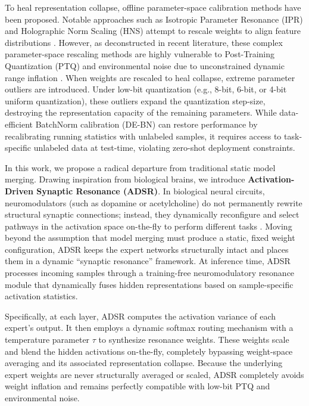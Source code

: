 \documentclass{article}
\theoremstyle{plain}
\theoremstyle{definition}
\theoremstyle{remark}
\begin{document}
To heal representation collapse, offline parameter-space calibration methods have been proposed. Notable approaches such as Isotropic Parameter Resonance (IPR) and Holographic Norm Scaling (HNS) attempt to rescale weights to align feature distributions \cite{leclaire24wasserstein}. However, as deconstructed in recent literature, these complex parameter-space rescaling methods are highly vulnerable to Post-Training Quantization (PTQ) and environmental noise due to unconstrained dynamic range inflation \cite{frantar23gptq, xiao23smoothquant}. When weights are rescaled to heal collapse, extreme parameter outliers are introduced. Under low-bit quantization (e.g., 8-bit, 6-bit, or 4-bit uniform quantization), these outliers expand the quantization step-size, destroying the representation capacity of the remaining parameters. While data-efficient BatchNorm calibration (DE-BN) can restore performance by recalibrating running statistics with unlabeled samples, it requires access to task-specific unlabeled data at test-time, violating zero-shot deployment constraints.

In this work, we propose a radical departure from traditional static model merging. Drawing inspiration from biological brains, we introduce \textbf{Activation-Driven Synaptic Resonance (ADSR)}. In biological neural circuits, neuromodulators (such as dopamine or acetylcholine) do not permanently rewrite structural synaptic connections; instead, they dynamically reconfigure and select pathways in the activation space on-the-fly to perform different tasks \cite{marder12neuromodulation, smith20biology}. Moving beyond the assumption that model merging must produce a static, fixed weight configuration, ADSR keeps the expert networks structurally intact and places them in a dynamic ``synaptic resonance'' framework. At inference time, ADSR processes incoming samples through a training-free neuromodulatory resonance module that dynamically fuses hidden representations based on sample-specific activation statistics.

Specifically, at each layer, ADSR computes the activation variance of each expert's output. It then employs a dynamic softmax routing mechanism with a temperature parameter $\tau$ to synthesize resonance weights. These weights scale and blend the hidden activations on-the-fly, completely bypassing weight-space averaging and its associated representation collapse. Because the underlying expert weights are never structurally averaged or scaled, ADSR completely avoids weight inflation and remains perfectly compatible with low-bit PTQ and environmental noise.
\end{document}
